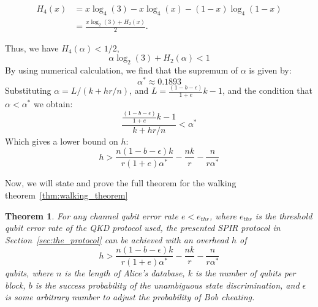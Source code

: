 \documentclass[%
 reprint,
superscriptaddress,
 amsmath,amssymb,
 aps,
]{revtex4-2}
\newtheorem{theorem}{Theorem}[section]
\begin{document}
\begin{equation}
\begin{split}
    H_4(x) &= x\log_4(3)-x\log_4(x)-(1-x)\log_4(1-x)\\
    &=\frac{x \log_2(3) + H_2(x)}{2}.
\end{split}
\end{equation}

Thus, we have $H_4(\alpha)<1/2$,
\begin{equation}
    \alpha\log_2(3)+H_2(\alpha)<1
\end{equation}
By using numerical calculation, we find that the supremum of $\alpha$ is given by:
\begin{equation}
    \alpha^*\approx0.1893
\end{equation}
Substituting $\alpha = L/(k+hr/n)$, and $L=\frac{(1-b-\epsilon)}{1+e}k-1$, and the condition that $\alpha < \alpha^*$ we obtain:
\begin{equation}
    \frac{\frac{(1-b-\epsilon)}{1+e}k-1}{k+hr/n}<\alpha^*
\end{equation}
Which gives a lower bound on $h$:
\begin{equation}
    h>\frac{n(1-b-\epsilon)k}{r(1+e)\alpha^*}-\frac{nk}{r}-\frac{n}{r\alpha^*}
\end{equation}

Now, we will state and prove the full theorem for the walking theorem~\ref{thm:walking_theorem}

\begin{theorem}
    For any channel qubit error rate $e<e_{thr}$, where $e_{thr}$ is the threshold qubit error rate of the QKD protocol used, the presented SPIR protocol in Section~\ref{sec:the_protocol} can be achieved with an overhead $h$ of
    \begin{equation}
        h>\frac{n(1-b-\epsilon)k}{r(1+e)\alpha^*}-\frac{nk}{r}-\frac{n}{r\alpha^*}
    \end{equation} 
    qubits, where $n$ is the length of Alice's database, $k$ is the number of qubits per block, $b$ is the success probability of the unambiguous state discrimination, and $\epsilon$ is some arbitrary number to adjust the probability of Bob cheating.
\label{thm:success_protocol}
\end{theorem}
\end{document}
